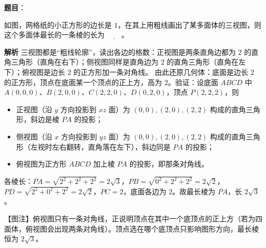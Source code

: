 \begin{answer}

\textbf{题目}：

如图，网格纸的小正方形的边长是 $1$，在其上用粗线画出了某多面体的三视图，则这个多面体最长的一条棱的长为 $\underline{\qquad}$。
\nopagebreak[4]
\begin{center}\end{center}
\nopagebreak[4]
\textbf{解析}
三视图都是“粗线轮廓”，读出各边的格数：正视图是两条直角边都为 $2$ 的直角三角形（直角在右下）；侧视图同样是直角边为 $2$ 的直角三角形（直角在左下）；俯视图是边长 $2$ 的正方形加一条对角线。
由此还原几何体：底面是边长 $2$ 的正方形，顶点在底面某一个顶点的正上方，高为 $2$。验证：设底面 $ABCD$ 中 $A(0,0,0)$、$B(2,0,0)$、$C(2,2,0)$、$D(0,2,0)$，顶点 $P(2,2,2)$，则
\begin{itemize}
\item 正视图（沿 $y$ 方向投影到 $xz$ 面）为 $(0,0),(2,0),(2,2)$ 构成的直角三角形，斜边是棱 $PA$ 的投影；
\item 侧视图（沿 $x$ 方向投影到 $yz$ 面）为 $(0,0),(2,0),(2,2)$ 构成的直角三角形（左视时左右翻转，直角落在左下），斜边同是 $PA$ 的投影；
\item 俯视图为正方形 $ABCD$ 加上棱 $PA$ 的投影，即那条对角线。
\end{itemize}
各棱长：$PA=\sqrt{2^2+2^2+2^2}=2\sqrt3$，$PB=\sqrt{0^2+2^2+2^2}=2\sqrt2$，$PD=\sqrt{2^2+0^2+2^2}=2\sqrt2$，$PC=2$，底面各边为 $2$。故最长棱为 $PA$，长 $2\sqrt3$。

【图注】俯视图只有一条对角线，正说明顶点在其中一个底顶点的正上方（若为四面体，俯视图会出现两条对角线）。顶点选在哪个底顶点只影响图形方向，最长棱恒为 $2\sqrt3$。


\end{answer}
